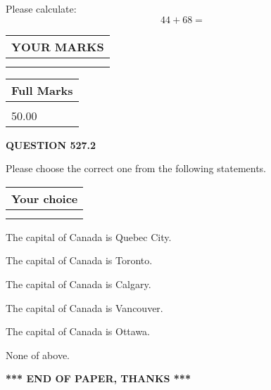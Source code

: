 \documentclass[12pt]{article}
\begin{document}
  
 
Please calculate:
\begin{equation}
44 +  %
68 = \nonumber
\end{equation}
 

 

 
  
\vspace{0.2in}
  
\noindent\begin{tabular}{|l|}
\hline
 YOUR MARKS  \\
\hline
 \\ 
 \\ 
\hline
\end{tabular}
\hspace{0.05in} \begin{tabular}{|l|}
\hline
 Full Marks  \\
\hline
 \\ 
50.00 \\
\hline
\end{tabular}
{\textbf{\Large{QUESTION
527.2 
}}}
  
  
Please choose the correct one from the following statements.
  
  
\noindent\hspace{3.0in} \begin{tabular}{|l|}
\hline
Your choice \\
\hline
 \\ 
 \\ 
\hline
\end{tabular}
  
  
 
 
The capital of Canada is Quebec City.
 
 
The capital of Canada is Toronto.
 
 
The capital of Canada is Calgary.
 
 
The capital of Canada is Vancouver.
 
 
The capital of Canada is Ottawa.
 
 
 None of above.
 
 
   
   
 \vspace{0.2in}
 
   
   
   
   
\vspace{1.0in} 
{\textbf{\large{ *** END OF PAPER, THANKS *** }}} 
   
\end{document}
